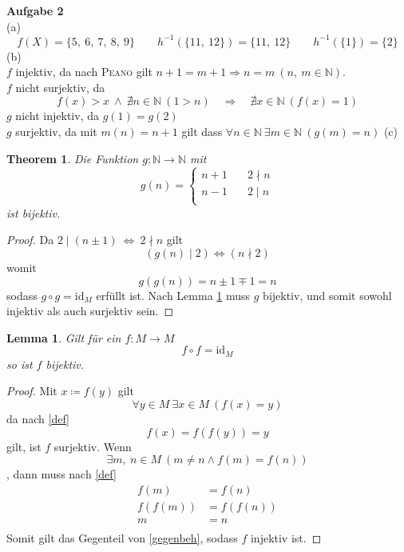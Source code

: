 \documentclass[a4paper, 12pt]{scrartcl}
\theoremstyle{plain}
\newtheorem{theorem}[part]{Theorem}
\newtheorem{lemma}[theorem]{Lemma}
\begin{document}
\textbf{Aufgabe 2}\\
(a)\\
\[ f(X) = \{ 5,\ 6,\ 7,\ 8,\ 9 \} \qquad h^{-1}\left( \{11,\ 12\} \right) = \{11,\ 12\} \qquad h^{-1}(\{1\}) = \{2\} \]
(b)\\
$f$ injektiv, da nach \textsc{Peano} gilt $n+1 = m+1 \Rightarrow n = m\ (n,\ m \in \mathbb{N})$. \\
$f$ nicht surjektiv, da
\[ f(x) > x \ \wedge\ \nexists n \in \mathbb{N}\ (1 > n) \quad \Rightarrow \quad \nexists x \in \mathbb{N}\ (f(x) = 1) \]
$g$ nicht injektiv, da $g(1) = g(2)$ \\
$g$ surjektiv, da mit $m(n) = n+1$ gilt dass $\forall n \in \mathbb{N}\ \exists m \in \mathbb{N}\ (g(m) = n)$
\newpage
(c)
\begin{theorem}
Die Funktion $g : \mathbb{N} \rightarrow \mathbb{N}$ mit
\[ g(n) = \begin{cases} n+1 &\quad 2 \nmid n \\ n-1 &\quad 2 \mid n \\ \end{cases} \]
ist bijektiv.
\end{theorem}
\begin{proof}
Da $2 \mid (n \pm 1) \:\Leftrightarrow\: 2 \nmid n$ gilt
\[ (g(n) \mid 2) \Leftrightarrow (n \nmid 2) \]
womit
\[ g(g(n)) = n \pm 1 \mp 1 = n \]
sodass $g \circ g = \mathrm{id}_M$ erfüllt ist. Nach Lemma \ref{klemma} muss $g$ bijektiv, und somit sowohl injektiv als auch surjektiv sein.
\end{proof}
\begin{lemma}\label{klemma}
Gilt für ein $f:M \rightarrow M$
\begin{equation}\label{def}
	f \circ f = \mathrm{id}_M
\end{equation}
so ist $f$ bijektiv.
\end{lemma}
\begin{proof}
Mit $x \coloneqq f(y)$ gilt
\[ \forall y \in M\ \exists x \in M\ (f(x) = y) \]
da nach \eqref{def}
\[ f(x) = f(f(y)) = y \]
gilt, ist $f$ surjektiv.
Wenn
\begin{equation}\label{gegenbeh}
	\exists m,\ n \in M\ (m \neq n \wedge f(m) = f(n))
\end{equation}
, dann muss nach \eqref{def}
\begin{align*}
	f(m) &= f(n) \\
	f(f(m)) &= f(f(n)) \\
	m &= n \\ %
\end{align*}
Somit gilt das Gegenteil von \eqref{gegenbeh}, sodass $f$ injektiv ist.
\end{proof}
\end{document}
